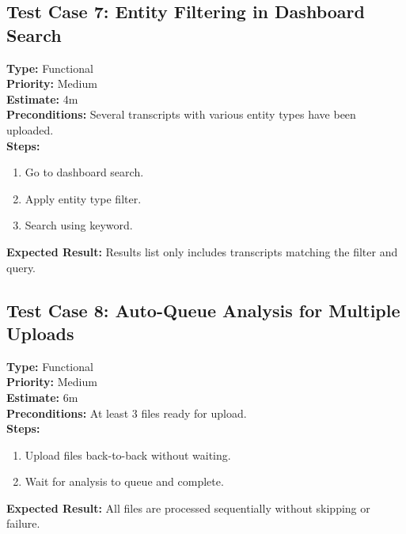 \documentclass[12pt]{article}
\begin{document}
\subsection*{Test Case 7: Entity Filtering in Dashboard Search}
\textbf{Type:} Functional \\
\textbf{Priority:} Medium \\
\textbf{Estimate:} 4m \\
\textbf{Preconditions:} Several transcripts with various entity types have been uploaded. \\
\textbf{Steps:}
\begin{enumerate}[label=\arabic*.]
\item Go to dashboard search.
\item Apply entity type filter.
\item Search using keyword.
\end{enumerate}
\textbf{Expected Result:} Results list only includes transcripts matching the filter and query.

\subsection*{Test Case 8: Auto-Queue Analysis for Multiple Uploads}
\textbf{Type:} Functional \\
\textbf{Priority:} Medium \\
\textbf{Estimate:} 6m \\
\textbf{Preconditions:} At least 3 files ready for upload. \\
\textbf{Steps:}
\begin{enumerate}[label=\arabic*.]
\item Upload files back-to-back without waiting.
\item Wait for analysis to queue and complete.
\end{enumerate}
\textbf{Expected Result:} All files are processed sequentially without skipping or failure.
\end{document}
